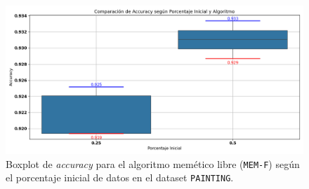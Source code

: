 \begin{figure}[htp]
    \centering
    \includegraphics[width=1\textwidth]{imagenes/evaluaciones/painting/comparacion-por-porcentaje-mem-f}
    \caption{Boxplot de \textit{accuracy} para el algoritmo memético libre (\texttt{MEM-F}) según el porcentaje inicial de datos en el dataset \texttt{PAINTING}.}
    \label{fig:comparacion-por-porcentaje-mem-f}
\end{figure}

